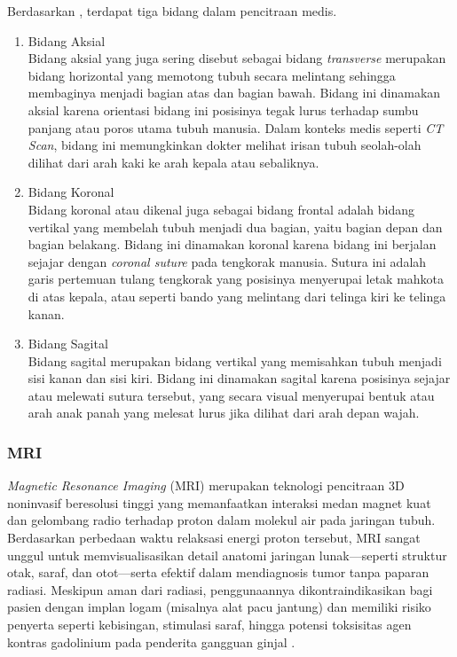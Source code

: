Berdasarkan \textcite{radiologykey2015brain}, terdapat tiga bidang dalam pencitraan medis.
\begin{enumerate}
	\item Bidang Aksial\\
	Bidang aksial yang juga sering disebut sebagai bidang \textit{transverse} merupakan bidang horizontal yang memotong tubuh secara melintang sehingga membaginya menjadi bagian atas dan bagian bawah. Bidang ini dinamakan aksial karena orientasi bidang ini posisinya tegak lurus terhadap sumbu panjang atau poros utama tubuh manusia. Dalam konteks medis seperti \textit{CT Scan}, bidang ini memungkinkan dokter melihat irisan tubuh seolah-olah dilihat dari arah kaki ke arah kepala atau sebaliknya.
	\item Bidang Koronal \\
	Bidang koronal atau dikenal juga sebagai bidang frontal adalah bidang vertikal yang membelah tubuh menjadi dua bagian, yaitu bagian depan dan bagian belakang. Bidang ini dinamakan koronal karena bidang ini berjalan sejajar dengan \textit{coronal suture} pada tengkorak manusia. Sutura ini adalah garis pertemuan tulang tengkorak yang posisinya menyerupai letak mahkota di atas kepala, atau seperti bando yang melintang dari telinga kiri ke telinga kanan.
	\item Bidang Sagital \\
	Bidang sagital merupakan bidang vertikal yang memisahkan tubuh menjadi sisi kanan dan sisi kiri. Bidang ini dinamakan sagital karena posisinya sejajar atau melewati sutura tersebut, yang secara visual menyerupai bentuk atau arah anak panah yang melesat lurus jika dilihat dari arah depan wajah.
\end{enumerate}

\subsubsection{MRI}
\textit{Magnetic Resonance Imaging} (MRI) merupakan teknologi pencitraan 3D noninvasif beresolusi tinggi yang memanfaatkan interaksi medan magnet kuat dan gelombang radio terhadap proton dalam molekul air pada jaringan tubuh. Berdasarkan perbedaan waktu relaksasi energi proton tersebut, MRI sangat unggul untuk memvisualisasikan detail anatomi jaringan lunak—seperti struktur otak, saraf, dan otot—serta efektif dalam mendiagnosis tumor tanpa paparan radiasi. Meskipun aman dari radiasi, penggunaannya dikontraindikasikan bagi pasien dengan implan logam (misalnya alat pacu jantung) dan memiliki risiko penyerta seperti kebisingan, stimulasi saraf, hingga potensi toksisitas agen kontras gadolinium pada penderita gangguan ginjal \autocite{nibib2025mri}.

